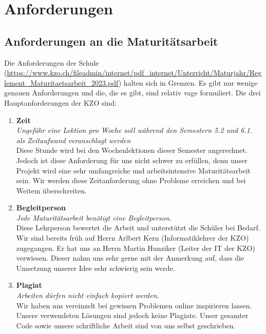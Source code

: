 \chapter{Anforderungen}

\section{Anforderungen an die Maturitätsarbeit}
Die Anforderungen der Schule (\url{https://www.kzo.ch/fileadmin/internet/pdf_internet/Unterricht/Maturjahr/Reglement_Maturitaetsarbeit_2023.pdf}) halten sich in Grenzen. Es gibt nur wenige genauen Anforderungen
und die, die es gibt, sind relativ vage formuliert. Die drei Hauptanforderungen der KZO sind:
\begin{enumerate}
    \item \textbf{Zeit} \\
        \textit{Ungefähr eine Lektion pro Woche soll während den Semestern 5.2 und 6.1. als Zeitaufwand veranschlagt werden}\\Diese Stunde wird bei den Wochenlektionen dieser Semester angerechnet.
        Jedoch ist diese Anforderung für uns nicht schwer zu erfüllen, denn unser Projekt wird eine sehr umfangreiche und arbeitsintensive Maturitätsarbeit sein.
        Wir werden diese Zeitanforderung ohne Probleme erreichen und bei Weitem überschreiten.
    \item \textbf{Begleitperson} \\
        \textit{Jede Maturitätsarbeit benötigt eine Begleitperson. }\\Diese Lehrperson bewertet die Arbeit und unterstützt die Schüler bei Bedarf.
        Wir sind bereits früh auf Herrn Arlbert Kern (Informatiklehrer der KZO) zugegangen.
        Er hat uns an Herrn Martin Hunziker (Leiter der IT der KZO) verwiesen. Dieser nahm uns sehr gerne mit der Anmerkung auf, dass die Umsetzung unserer Idee sehr schwierig sein werde.
    \item \textbf{Plagiat} \\
        \textit{Arbeiten dürfen nicht einfach kopiert werden. }\\Wir haben uns vereinzelt bei gewissen Problemen online inspirieren lassen. Unsere verwendeten Lösungen sind jedoch keine Plagiate.
        Unser gesamter Code sowie unsere schriftliche Arbeit sind von uns selbst geschrieben.
\end{enumerate}

